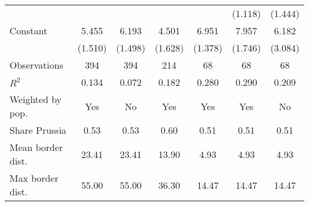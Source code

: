 {\begin{tabular}{l*{6}{c}}
                    &                     &                     &                     &                     &     (1.118)         &     (1.444)         \\
[1em]
Constant            &       5.455\sym{***}&       6.193\sym{***}&       4.501\sym{***}&       6.951\sym{***}&       7.957\sym{***}&       6.182\sym{**} \\
                    &     (1.510)         &     (1.498)         &     (1.628)         &     (1.378)         &     (1.746)         &     (3.084)         \\
\hline
Observations        &         394         &         394         &         214         &          68         &          68         &          68         \\
\(R^{2}\)           &       0.134         &       0.072         &       0.182         &       0.280         &       0.290         &       0.209         \\
Weighted by pop.    &         Yes         &          No         &         Yes         &         Yes         &         Yes         &          No         \\
Share Prussia       &        0.53         &        0.53         &        0.60         &        0.51         &        0.51         &        0.51         \\
Mean border dist.   &       23.41         &       23.41         &       13.90         &        4.93         &        4.93         &        4.93         \\
Max border dist.    &       55.00         &       55.00         &       36.30         &       14.47         &       14.47         &       14.47         \\
\hline\hline
\end{tabular}
}
